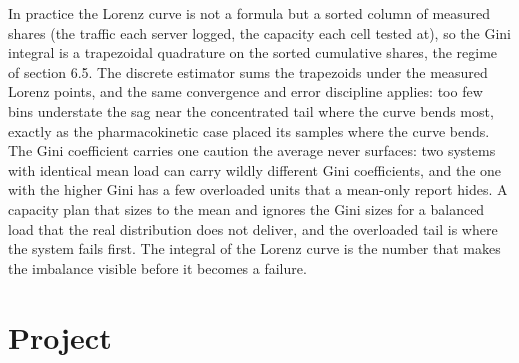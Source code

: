 In practice the Lorenz curve is not a formula but a sorted column of
measured shares (the traffic each server logged, the capacity each cell
tested at), so the Gini integral is a trapezoidal quadrature on the sorted
cumulative shares, the regime of section 6.5. The discrete estimator sums
the trapezoids under the measured Lorenz points, and the same convergence
and error discipline applies: too few bins understate the sag near the
concentrated tail where the curve bends most, exactly as the
pharmacokinetic case placed its samples where the curve bends. The Gini
coefficient carries one caution the average never surfaces: two systems
with identical mean load can carry wildly different Gini coefficients, and
the one with the higher Gini has a few overloaded units that a mean-only
report hides. A capacity plan that sizes to the mean and ignores the Gini
sizes for a balanced load that the real distribution does not deliver, and
the overloaded tail is where the system fails first. The integral of the
Lorenz curve is the number that makes the imbalance visible before it
becomes a failure.



\section{Project}

